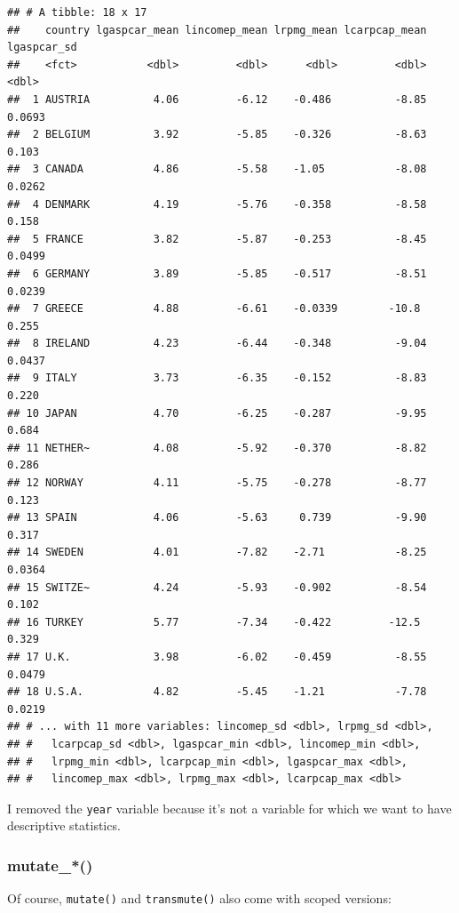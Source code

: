 \documentclass[]{gitbook}
\newenvironment{Shaded}{\begin{snugshade}}{\end{snugshade}}
\newcommand{\KeywordTok}[1]{\textcolor[rgb]{0.13,0.29,0.53}{\textbf{#1}}}
\newcommand{\NormalTok}[1]{#1}
\newcommand{\OperatorTok}[1]{\textcolor[rgb]{0.81,0.36,0.00}{\textbf{#1}}}
\newcommand{\StringTok}[1]{\textcolor[rgb]{0.31,0.60,0.02}{#1}}
\begin{document}
\begin{verbatim}
## # A tibble: 18 x 17
##    country lgaspcar_mean lincomep_mean lrpmg_mean lcarpcap_mean lgaspcar_sd
##    <fct>           <dbl>         <dbl>      <dbl>         <dbl>       <dbl>
##  1 AUSTRIA          4.06         -6.12    -0.486          -8.85      0.0693
##  2 BELGIUM          3.92         -5.85    -0.326          -8.63      0.103 
##  3 CANADA           4.86         -5.58    -1.05           -8.08      0.0262
##  4 DENMARK          4.19         -5.76    -0.358          -8.58      0.158 
##  5 FRANCE           3.82         -5.87    -0.253          -8.45      0.0499
##  6 GERMANY          3.89         -5.85    -0.517          -8.51      0.0239
##  7 GREECE           4.88         -6.61    -0.0339        -10.8       0.255 
##  8 IRELAND          4.23         -6.44    -0.348          -9.04      0.0437
##  9 ITALY            3.73         -6.35    -0.152          -8.83      0.220 
## 10 JAPAN            4.70         -6.25    -0.287          -9.95      0.684 
## 11 NETHER~          4.08         -5.92    -0.370          -8.82      0.286 
## 12 NORWAY           4.11         -5.75    -0.278          -8.77      0.123 
## 13 SPAIN            4.06         -5.63     0.739          -9.90      0.317 
## 14 SWEDEN           4.01         -7.82    -2.71           -8.25      0.0364
## 15 SWITZE~          4.24         -5.93    -0.902          -8.54      0.102 
## 16 TURKEY           5.77         -7.34    -0.422         -12.5       0.329 
## 17 U.K.             3.98         -6.02    -0.459          -8.55      0.0479
## 18 U.S.A.           4.82         -5.45    -1.21           -7.78      0.0219
## # ... with 11 more variables: lincomep_sd <dbl>, lrpmg_sd <dbl>,
## #   lcarpcap_sd <dbl>, lgaspcar_min <dbl>, lincomep_min <dbl>,
## #   lrpmg_min <dbl>, lcarpcap_min <dbl>, lgaspcar_max <dbl>,
## #   lincomep_max <dbl>, lrpmg_max <dbl>, lcarpcap_max <dbl>
\end{verbatim}

I removed the \texttt{year} variable because it's not a variable for which we want to have descriptive
statistics.

\hypertarget{mutate_}{%
\subsubsection{mutate\_*()}\label{mutate_}}

Of course, \texttt{mutate()} and \texttt{transmute()} also come with scoped versions:

\begin{Shaded}
\end{Shaded}
\end{document}
